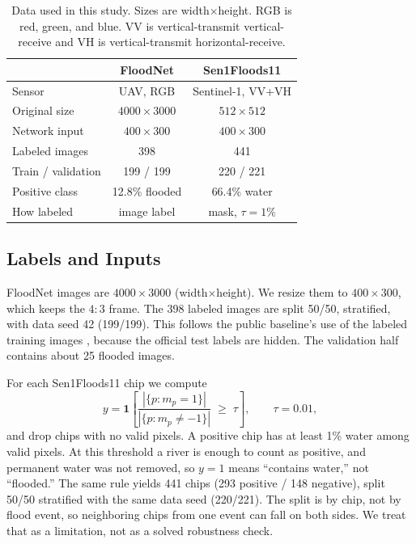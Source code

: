 \documentclass[conference]{IEEEtran}
\begin{document}
\begin{table}[t]
\centering
\caption{Data used in this study. Sizes are width$\times$height.
RGB is red, green, and blue. VV is vertical-transmit
vertical-receive and VH is vertical-transmit horizontal-receive.}
\label{tab:datasets}
\footnotesize
\setlength{\tabcolsep}{3.2pt}
\begin{tabular}{lcc}
\toprule
 & \textbf{FloodNet} & \textbf{Sen1Floods11}\\
\midrule
Sensor & UAV, RGB & Sentinel-1, VV+VH\\
Original size & $4000{\times}3000$ & $512{\times}512$\\
Network input & $400{\times}300$ & $400{\times}300$\\
Labeled images & 398 & 441\\
Train / validation & 199 / 199 & 220 / 221\\
Positive class & 12.8\% flooded & 66.4\% water\\
How labeled & image label & mask, $\tau{=}1\%$\\
\bottomrule
\end{tabular}
\end{table}

\subsection{Labels and Inputs}
FloodNet images are $4000\times3000$ (width$\times$height). We resize
them to $400\times300$, which keeps the $4{:}3$ frame. The 398 labeled
images are split 50/50, stratified, with data seed 42 (199/199). This
follows the public baseline's use of the labeled training images
\cite{khose2021semisupervised}, because the official test labels are
hidden. The validation half contains about 25 flooded images.

For each Sen1Floods11 chip we compute
\begin{equation}
y = \mathbf{1}\!\left[\frac{\left|\{p : m_p = 1\}\right|}
{\left|\{p : m_p \neq -1\}\right|} \;\geq\; \tau\right],
\qquad \tau = 0.01,
\label{eq:labelconv}
\end{equation}
and drop chips with no valid pixels. A positive chip has at least 1\%
water among valid pixels. At this threshold a river is enough to count
as positive, and permanent water was not removed, so $y{=}1$ means
``contains water,'' not ``flooded.'' The same rule yields 441 chips
(293 positive / 148 negative), split 50/50 stratified with the same
data seed (220/221). The split is by chip, not by flood event, so
neighboring chips from one event can fall on both sides. We treat that
as a limitation, not as a solved robustness check.
\end{document}
